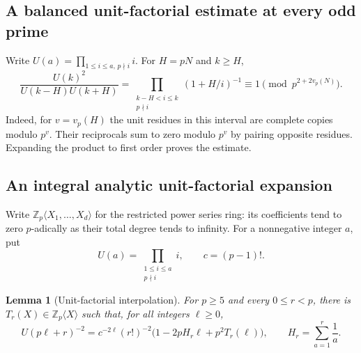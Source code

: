 \documentclass[11pt,a4paper]{article}
\newtheorem{lemma}[theorem]{Lemma}
\theoremstyle{definition}\newtheorem{definition}[theorem]{Definition}
\theoremstyle{remark}\newtheorem{remark}[theorem]{Remark}
\numberwithin{equation}{section}
\begin{document}
\subsection{A balanced unit-factorial estimate at every odd prime}
Write $U(a)=\prod_{1\le i\le a,\,p\nmid i}i$. For $H=pN$ and $k\ge H$,
\[
 \frac{U(k)^2}{U(k-H)U(k+H)}
 =\prod_{\substack{k-H<i\le k\\p\nmid i}}(1+H/i)^{-1}
 \equiv1\pmod{p^{2+2v_p(N)}}.
\]
Indeed, for $v=v_p(H)$ the unit residues in this interval are complete
copies modulo $p^v$. Their reciprocals sum to zero modulo $p^v$ by
pairing opposite residues. Expanding the product to first order proves
the estimate.
\subsection{An integral analytic unit-factorial expansion}

Write \(\mathbb Z_p\langle X_1,\ldots,X_d\rangle\) for the
restricted power series ring: its coefficients tend to zero
\(p\)-adically as their total degree tends to infinity.
For a nonnegative integer \(a\), put
\[
 U(a)=\prod_{\substack{1\leq i\leq a\\p\nmid i}}i,
 \qquad c=(p-1)!.
\]

\begin{lemma}[Unit-factorial interpolation]
\label{OP:lem:unit-factorial}
For $p\ge5$ and every \(0\leq r<p\), there is
\(T_r(X)\in\mathbb Z_p\langle X\rangle\) such that, for all
integers \(\ell\geq0\),
\begin{equation}\label{OP:eq:unit-expansion}
 U(p\ell+r)^{-2}
 =c^{-2\ell}(r!)^{-2}
   \bigl(1-2pH_r\ell+p^2T_r(\ell)\bigr),
 \qquad H_r=\sum_{a=1}^r\frac1a.
\end{equation}
\end{lemma}
\end{document}
